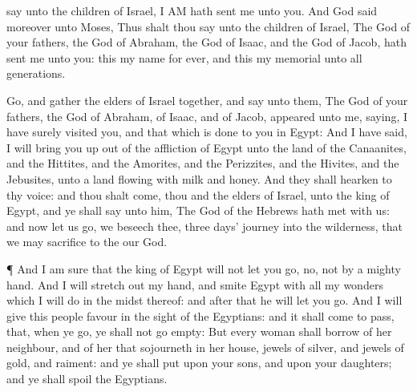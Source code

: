 {say unto the
children of
Israel, I AM hath
sent me unto you.
And
God
said
moreover unto
Moses, Thus shalt thou
say unto the
children of
Israel, The
{}
God of your
fathers, the
God of
Abraham, the
God of
Isaac, and the
God of
Jacob, hath
sent me unto you: this
{} my
name for
ever, and this
{} my
memorial unto
all
generations.
\par }{\PP {}Go, and
gather the
elders of
Israel
together, and
say unto them, The
{}
God of your
fathers, the
God of
Abraham, of
Isaac, and of
Jacob,
appeared unto me,
saying, I have
surely
visited you, and
{} that which is
done to you in
Egypt:
And I have
said, I will
bring you up out of the
affliction of
Egypt unto the
land of the
Canaanites, and the
Hittites, and the
Amorites, and the
Perizzites, and the
Hivites, and the
Jebusites, unto a
land
flowing with
milk and
honey.
And they shall
hearken to thy
voice: and thou shalt
come, thou and the
elders of
Israel, unto the
king of
Egypt, and ye shall
say unto him, The
{}
God of the
Hebrews hath
met with us: and now let us
go, we beseech thee,
three
days’
journey into the
wilderness, that we may
sacrifice to the
{} our
God.
\par }{\PP {}¶ And I am
sure that the
king of
Egypt will not
let you
go, no, not by a
mighty
hand.
And I will stretch
out my
hand, and
smite
Egypt with all my
wonders which I will
do in the
midst thereof: and
after that he will let you
go.
And I will
give this
people
favour in the
sight of the
Egyptians: and it shall come to pass, that, when ye
go, ye shall not
go
empty:
But every
woman shall
borrow of her
neighbour, and of her that
sojourneth in her
house,
jewels of
silver, and
jewels of
gold, and
raiment: and ye shall
put
{} upon your
sons, and upon your
daughters; and ye shall
spoil the
Egyptians.

}
